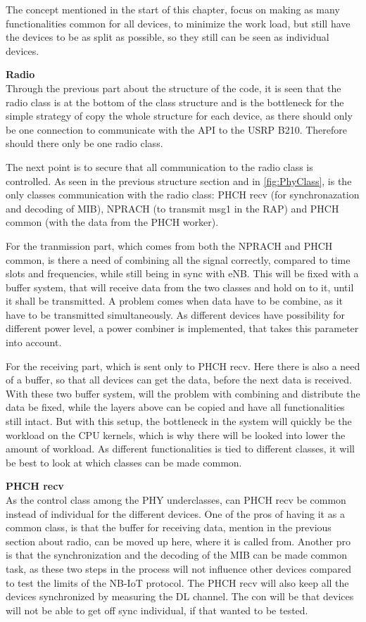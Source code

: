 The concept mentioned in the start of this chapter, focus on making as many functionalities common for all devices, to minimize the work load, but still have the devices to be as split as possible, so they still can be seen as individual devices.

\textbf{Radio}\\
Through the previous part about the structure of the code, it is seen that the radio class is at the bottom of the class structure and is the bottleneck for the simple strategy of copy the whole structure for each device, as there should only be one connection to communicate with the API to the USRP B210. Therefore should there only be one radio class.

The next point is to secure that all communication to the radio class is controlled. As seen in the previous structure section and in \autoref{fig:PhyClass}, is the only classes communication with the radio class: PHCH recv (for synchronazation and decoding of MIB), NPRACH (to transmit msg1 in the RAP) and PHCH common (with the data from the PHCH worker).

For the tranmission part, which comes from both the NPRACH and PHCH common, is there a need of combining all the signal correctly, compared to time slots and frequencies, while still being in sync with eNB. This will be fixed with a buffer system, that will receive data from the two classes and hold on to it, until it shall be transmitted. A problem comes when data have to be combine, as it have to be transmitted simultaneously. As different devices have possibility for different power level, a power combiner is implemented, that takes this parameter into account.

For the receiving part, which is sent only to PHCH recv. Here there is also a need of a buffer, so that all devices can get the data, before the next data is received. 
With these two buffer system, will the problem with combining and distribute the data be fixed, while the layers above can be copied and have all functionalities still intact. But with this setup, the bottleneck in the system will quickly be the workload on the CPU kernels, which is why there will be looked into lower the amount of workload. As different functionalities is tied to different classes, it will be best to look at which classes can be made common.

\textbf{PHCH recv}\\
As the control class among the PHY underclasses, can PHCH recv be common instead of individual for the different devices. One of the pros of having it as a common class, is that the buffer for receiving data, mention in the previous section about radio, can be moved up here, where it is called from. Another pro is that the synchronization and the decoding of the MIB can be made common task, as these two steps in the process will not influence other devices compared to test the limits of the NB-IoT protocol. The PHCH recv will also keep all the devices synchronized by measuring the DL channel. The con will be that devices will not be able to get off sync individual, if that wanted to be tested.

